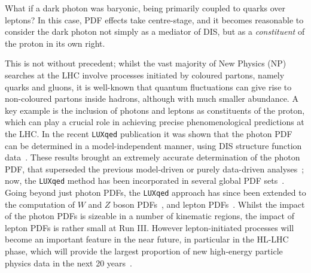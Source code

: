 \documentclass[withindex,glossary]{cam-thesis}
\begin{document}
\noindent What if a dark photon was baryonic, being primarily coupled to quarks over leptons? In this case, PDF effects take centre-stage, and 
it becomes reasonable to consider the dark photon not simply as a mediator of DIS, but as a \textit{constituent} of the proton in its own right. 

This is not without precedent; whilst the vast majority of New Physics (NP) searches at the LHC
involve processes initiated by coloured partons, namely
quarks and gluons, it is well-known that quantum fluctuations can give rise to non-coloured
partons inside hadrons, although with much smaller abundance. A key example is the inclusion 
of photons and leptons as constituents of the proton, which can play a
crucial role in achieving precise phenomenological
predictions at the LHC. In the recent {\tt LUXqed} publication it was shown that the photon PDF can
be determined in a model-independent manner, using DIS structure
function data~\cite{Manohar:2016nzj,Manohar:2017eqh}. These results brought an extremely accurate
determination of the photon PDF, that superseded the previous model-driven or purely data-driven analyses~\cite{Martin:2005,Ball:2013}; now, the {\tt LUXqed} method has been incorporated in several global PDF sets~\cite{Bertone:2017bme,Cridge:2021pxm,Guzzi:2021rvo}.
Going beyond just photon PDFs, the {\tt LUXqed} approach has since been extended to the computation
of $W$ and $Z$ boson PDFs~\cite{Fornal:2018znf}, and lepton PDFs~\cite{Buonocore:2020nai}.
Whilst the impact of the photon PDFs is sizeable in a number of
kinematic regions, the impact of lepton PDFs is rather small at Run III. However
lepton-initiated processes will become an important feature in the near future, 
in particular in the HL-LHC phase, which  
will provide the largest proportion of new high-energy particle physics data in the next 20 years~\cite{Buonocore:2020erb,Greljo:2020tgv,Buonocore:2021bsf,Harland-Lang:2021zvr}.
\end{document}
